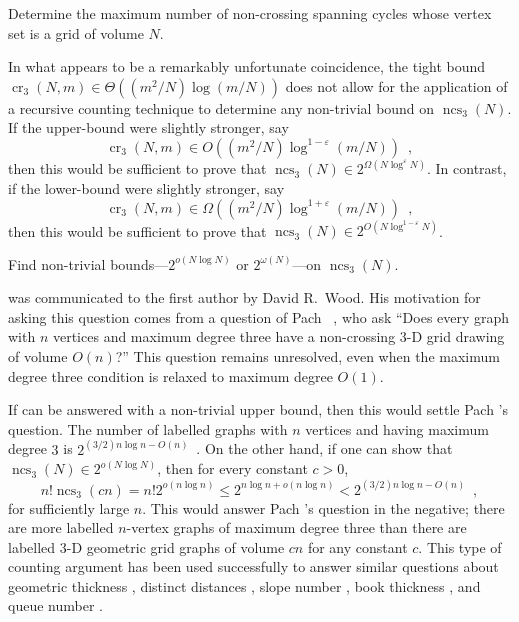 \documentclass{patmorin}
\newcommand{\n}{N}
\DeclareMathOperator{\crs}{cr}
\DeclareMathOperator{\ncs}{ncs}
\begin{document}
\begin{op}
  Determine the maximum number of non-crossing spanning cycles whose
  vertex set is a grid of volume $\n$.
\end{op}

In what appears to be a remarkably unfortunate coincidence, the tight
bound $\crs_3(\n,m)\in \Theta((m^2/\n)\log (m/\n))$ does not allow for the
application of a recursive counting technique to determine any non-trivial
bound on $\ncs_3(\n)$.  If the upper-bound were slightly stronger, say
\[
   \crs_3(\n,m)\in O((m^2/\n)\log^{1-\varepsilon}(m/\n)) \enspace ,
\]
then this would be sufficient to prove that
$\ncs_3(\n)\in2^{\Omega(\n\log^{\varepsilon}\n)}$.  In contrast, if the
lower-bound were slightly stronger, say
\[
  \crs_3(\n,m)\in \Omega((m^2/\n)\log^{1+\varepsilon}(m/\n)) \enspace ,
\]
then this would be sufficient to prove that
$\ncs_3(\n)\in2^{O(\n\log^{1-\varepsilon}\n)}$.

\begin{op}[Wood]
  Find non-trivial bounds---$2^{o(\n\log\n)}$ or $2^{\omega(\n)}$---on
  $\ncs_3(\n)$.
\end{op}

 was communicated to the first author by David R.\
Wood.  His motivation for asking this question comes from a question of
Pach \etal~\cite{pach.thiele.ea:three-dimensional}, who ask ``Does every
graph with $n$ vertices and maximum degree three have a non-crossing
3-D grid drawing of volume $O(n)$?''  This question remains unresolved,
even when the maximum degree three condition is relaxed to maximum
degree $O(1)$.

If  can be answered with a  non-trivial upper bound,
then this would settle Pach \etal's question.  The number of labelled
graphs with $n$ vertices and having maximum degree $3$ is $2^{(3/2)n\log
n - O(n)}$~\cite[Appendix~A]{barat.matousek.ea:bounded-degree}. On the
other hand, if one can show that $\ncs_3(\n)\in 2^{o(\n\log\n)}$, then
for every constant $c>0$,
\[
   n!\ncs_3(cn) = n!2^{o(n\log n)} \le 2^{n\log n + o(n\log n)}
   < 2^{(3/2)n\log n - O(n)} \enspace ,
\]
for sufficiently large $n$. This would answer Pach \etal's question
in the negative; there are more labelled $n$-vertex graphs of
maximum degree three than there are labelled 3-D geometric grid
graphs of volume $cn$ for any constant $c$.   This type of counting
argument has been used successfully to answer similar questions
about geometric thickness \cite{barat.matousek.ea:bounded-degree},
distinct distances \cite{carmi.dujmovic.ea:distinct}, slope number
\cite{pach.palvolgyi:bounded}, book thickness \cite{malitz:graphs},
and queue number \cite{malitz:graphs,wood:bounded}.
\end{document}
